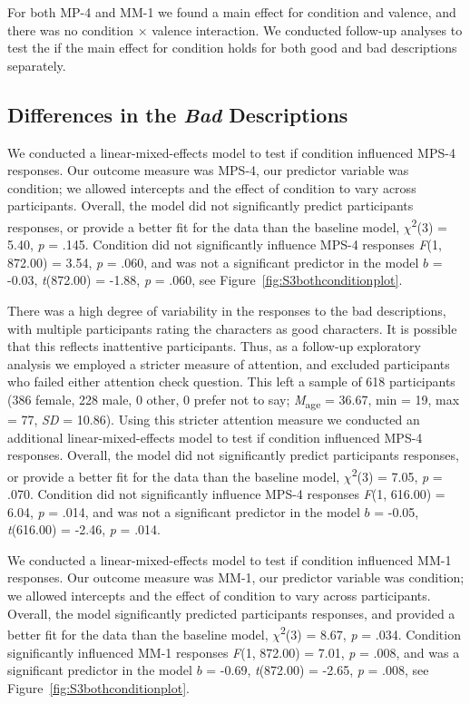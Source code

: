 \documentclass[
  english,
  man,floatsintext]{apa7}
\begin{document}
For both MP-4 and MM-1 we found a main effect for condition and valence, and there was no condition \(\times\) valence interaction. We conducted follow-up analyses to test the if the main effect for condition holds for both good and bad descriptions separately.

\hypertarget{differences-in-the-bad-descriptions}{%
\subsection{\texorpdfstring{Differences in the \emph{Bad} Descriptions}{Differences in the Bad Descriptions}}\label{differences-in-the-bad-descriptions}}

We conducted a linear-mixed-effects model to test if condition influenced MPS-4 responses. Our outcome measure was MPS-4, our predictor variable was condition; we allowed intercepts and the effect of condition to vary across participants. Overall, the model did not significantly predict participants responses, or provide a better fit for the data than the baseline model, \(\chi\)\textsuperscript{2}(3) = 5.40, \emph{p} = .145. Condition did not significantly influence MPS-4 responses \emph{F}(1, 872.00) = 3.54, \emph{p} = .060, and was not a significant predictor in the model \(b\) = -0.03, \emph{t}(872.00) = -1.88, \emph{p} = .060, see Figure~\ref{fig:S3bothconditionplot}.

There was a high degree of variability in the responses to the bad descriptions, with multiple participants rating the characters as good characters. It is possible that this reflects inattentive participants. Thus, as a follow-up exploratory analysis we employed a stricter measure of attention, and excluded participants who failed either attention check question. This left a sample of 618 participants (386 female, 228 male, 0 other, 0 prefer not to say; \emph{M}\textsubscript{age} = 36.67, min = 19, max = 77, \emph{SD} = 10.86). Using this stricter attention measure we conducted an additional linear-mixed-effects model to test if condition influenced MPS-4 responses. Overall, the model did not significantly predict participants responses, or provide a better fit for the data than the baseline model, \(\chi\)\textsuperscript{2}(3) = 7.05, \emph{p} = .070. Condition did not significantly influence MPS-4 responses \emph{F}(1, 616.00) = 6.04, \emph{p} = .014, and was not a significant predictor in the model \(b\) = -0.05, \emph{t}(616.00) = -2.46, \emph{p} = .014.

We conducted a linear-mixed-effects model to test if condition influenced MM-1 responses. Our outcome measure was MM-1, our predictor variable was condition; we allowed intercepts and the effect of condition to vary across participants. Overall, the model significantly predicted participants responses, and provided a better fit for the data than the baseline model, \(\chi\)\textsuperscript{2}(3) = 8.67, \emph{p} = .034. Condition significantly influenced MM-1 responses \emph{F}(1, 872.00) = 7.01, \emph{p} = .008, and was a significant predictor in the model \(b\) = -0.69, \emph{t}(872.00) = -2.65, \emph{p} = .008, see Figure~\ref{fig:S3bothconditionplot}.
\end{document}
